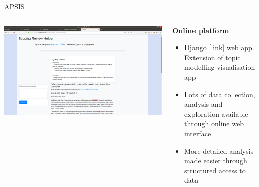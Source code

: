 \documentclass[9pt]{beamer}
\begin{document}
\begin{frame}{APSIS} %
\begin{columns}
	\begin{column}{0.6\linewidth}
		\includegraphics[width=\linewidth]{images/screenshot_apsis}
	\end{column}
	\begin{column}{0.4\linewidth}
		\textbf{Online platform}
		\begin{itemize}
			\item Django [link] web app. Extension of topic modelling visualisation app \citep{Chaney2012}
			\item Lots of data collection, analysis and exploration available through online web interface
			\item More detailed analysis made easier through structured access to data
		\end{itemize}
	\end{column}
\end{columns}

\end{frame}
\end{document}
